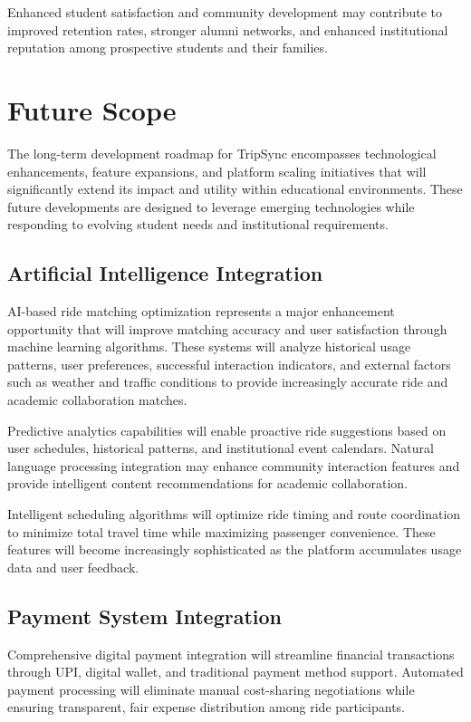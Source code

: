 \documentclass[conference]{IEEEtran}
\begin{document}
Enhanced student satisfaction and community development may contribute to improved retention rates, stronger alumni networks, and enhanced institutional reputation among prospective students and their families.

\section{Future Scope}

The long-term development roadmap for TripSync encompasses technological enhancements, feature expansions, and platform scaling initiatives that will significantly extend its impact and utility within educational environments. These future developments are designed to leverage emerging technologies while responding to evolving student needs and institutional requirements.

\subsection{Artificial Intelligence Integration}

AI-based ride matching optimization represents a major enhancement opportunity that will improve matching accuracy and user satisfaction through machine learning algorithms. These systems will analyze historical usage patterns, user preferences, successful interaction indicators, and external factors such as weather and traffic conditions to provide increasingly accurate ride and academic collaboration matches.

Predictive analytics capabilities will enable proactive ride suggestions based on user schedules, historical patterns, and institutional event calendars. Natural language processing integration may enhance community interaction features and provide intelligent content recommendations for academic collaboration.

Intelligent scheduling algorithms will optimize ride timing and route coordination to minimize total travel time while maximizing passenger convenience. These features will become increasingly sophisticated as the platform accumulates usage data and user feedback.

\subsection{Payment System Integration}

Comprehensive digital payment integration will streamline financial transactions through UPI, digital wallet, and traditional payment method support. Automated payment processing will eliminate manual cost-sharing negotiations while ensuring transparent, fair expense distribution among ride participants.
\end{document}
